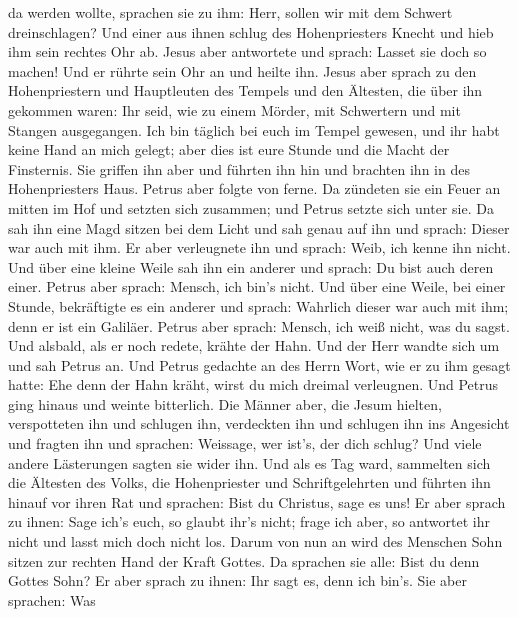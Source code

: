da werden wollte, sprachen sie zu ihm: Herr, sollen wir mit dem Schwert
dreinschlagen?  Und einer aus ihnen schlug des
Hohenpriesters Knecht und hieb ihm sein rechtes Ohr ab. 
Jesus aber antwortete und sprach: Lasset sie doch so machen! Und er
rührte sein Ohr an und heilte ihn.  Jesus aber sprach zu
den Hohenpriestern und Hauptleuten des Tempels und den Ältesten, die
über ihn gekommen waren: Ihr seid, wie zu einem Mörder, mit Schwertern
und mit Stangen ausgegangen.  Ich bin täglich bei euch im
Tempel gewesen, und ihr habt keine Hand an mich gelegt; aber dies ist
eure Stunde und die Macht der Finsternis.  Sie griffen ihn
aber und führten ihn hin und brachten ihn in des Hohenpriesters Haus.
Petrus aber folgte von ferne.  Da zündeten sie ein Feuer an
mitten im Hof und setzten sich zusammen; und Petrus setzte sich unter
sie.  Da sah ihn eine Magd sitzen bei dem Licht und sah
genau auf ihn und sprach: Dieser war auch mit ihm.  Er aber
verleugnete ihn und sprach: Weib, ich kenne ihn nicht.  Und
über eine kleine Weile sah ihn ein anderer und sprach: Du bist auch
deren einer. Petrus aber sprach: Mensch, ich bin's nicht. 
Und über eine Weile, bei einer Stunde, bekräftigte es ein anderer und
sprach: Wahrlich dieser war auch mit ihm; denn er ist ein Galiläer.
 Petrus aber sprach: Mensch, ich weiß nicht, was du sagst.
Und alsbald, als er noch redete, krähte der Hahn.  Und der
Herr wandte sich um und sah Petrus an. Und Petrus gedachte an des Herrn
Wort, wie er zu ihm gesagt hatte: Ehe denn der Hahn kräht, wirst du mich
dreimal verleugnen.  Und Petrus ging hinaus und weinte
bitterlich.  Die Männer aber, die Jesum hielten,
verspotteten ihn und schlugen ihn,  verdeckten ihn und
schlugen ihn ins Angesicht und fragten ihn und sprachen: Weissage, wer
ist's, der dich schlug?  Und viele andere Lästerungen
sagten sie wider ihn.  Und als es Tag ward, sammelten sich
die Ältesten des Volks, die Hohenpriester und Schriftgelehrten und
führten ihn hinauf vor ihren Rat  und sprachen: Bist du
Christus, sage es uns! Er aber sprach zu ihnen: Sage ich's euch, so
glaubt ihr's nicht;  frage ich aber, so antwortet ihr nicht
und lasst mich doch nicht los.  Darum von nun an wird des
Menschen Sohn sitzen zur rechten Hand der Kraft Gottes.  Da
sprachen sie alle: Bist du denn Gottes Sohn? Er aber sprach zu ihnen:
Ihr sagt es, denn ich bin's.  Sie aber sprachen: Was
